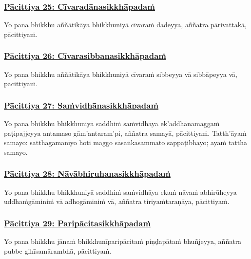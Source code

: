 \subsubsection*{\hyperref[exp25]{Pācittiya 25: Cīvaradānasikkhāpadaṁ}}
\label{pac25}

Yo pana bhikkhu aññātikāya bhikkhuniyā cīvaraṁ dadeyya, aññatra pārivattakā, pācittiyaṁ.



\subsubsection*{\hyperref[exp26]{Pācittiya 26: Cīvarasibbanasikkhāpadaṁ}}
\label{pac26}

Yo pana bhikkhu aññātikāya bhikkhuniyā cīvaraṁ sibbeyya vā sibbāpeyya vā, pācittiyaṁ.



\subsubsection*{\hyperref[exp27]{Pācittiya 27: Saṁvidhānasikkhāpadaṁ}}
\label{pac27}

Yo pana bhikkhu bhikkhuniyā saddhiṁ saṁvidhāya ek'addhānamaggaṁ paṭipajjeyya antamaso gām'antaram'pi, aññatra samayā, pācittiyaṁ. Tatth'āyaṁ samayo: satthagamanīyo hoti maggo sāsaṅkasammato sappaṭibhayo; ayaṁ tattha samayo.



\subsubsection*{\hyperref[exp28]{Pācittiya 28: Nāvābhiruhanasikkhāpadaṁ}}
\label{pac28}

Yo pana bhikkhu bhikkhuniyā saddhiṁ saṁvidhāya ekaṁ nāvaṁ abhirūheyya uddhaṁgāminiṁ vā adhogāminiṁ vā, aññatra tiriyaṁtaraṇāya, pācittiyaṁ.



\subsubsection*{\hyperref[exp29]{Pācittiya 29: Paripācitasikkhāpadaṁ}}
\label{pac29}

Yo pana bhikkhu jānaṁ bhikkhunīparipācitaṁ piṇḍapātaṁ bhuñjeyya, aññatra pubbe gihīsamārambhā, pācittiyaṁ.



